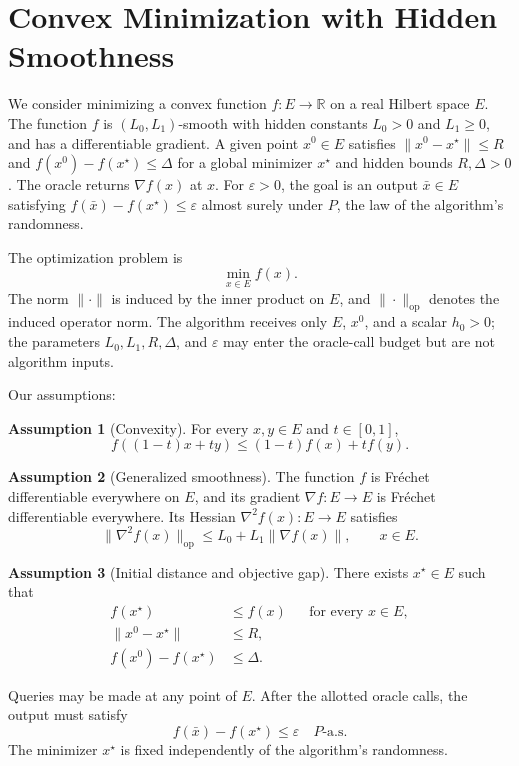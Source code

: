 \documentclass[10pt]{article}
\theoremstyle{definition}
\newtheorem{assumption}{Assumption}
\begin{document}
\section*{Convex Minimization with Hidden Smoothness}
We consider minimizing a convex function $f:E\to\mathbb{R}$ on a real Hilbert space $E$. The function $f$ is $(L_0,L_1)$-smooth with hidden constants $L_0>0$ and $L_1\geq0$, and has a differentiable gradient. A given point $x^0\in E$ satisfies $\|x^0-x^\star\|\leq R$ and $f(x^0)-f(x^\star)\leq\Delta$ for a global minimizer $x^\star$ and hidden bounds $R,\Delta>0$. The oracle returns $\nabla f(x)$ at $x$. For $\varepsilon>0$, the goal is an output $\bar{x}\in E$ satisfying $f(\bar{x})-f(x^\star)\leq\varepsilon$ almost surely under $P$, the law of the algorithm's randomness.

The optimization problem is
\[
\min_{x\in E} f(x).
\]
The norm $\|\cdot\|$ is induced by the inner product on $E$, and $\|\cdot\|_{\mathrm{op}}$ denotes the induced operator norm. The algorithm receives only $E$, $x^0$, and a scalar $h_0>0$; the parameters $L_0,L_1,R,\Delta$, and $\varepsilon$ may enter the oracle-call budget but are not algorithm inputs.

Our assumptions:
\begin{assumption}[Convexity]
For every $x,y\in E$ and $t\in[0,1]$,
\[
f((1-t)x+ty)\leq (1-t)f(x)+t f(y).
\]
\end{assumption}

\begin{assumption}[Generalized smoothness]
The function $f$ is Fr\'echet differentiable everywhere on $E$, and its gradient $\nabla f:E\to E$ is Fr\'echet differentiable everywhere. Its Hessian $\nabla^2 f(x):E\to E$ satisfies
\[
\|\nabla^2 f(x)\|_{\mathrm{op}}
\leq L_0+L_1\|\nabla f(x)\|,
\qquad x\in E.
\]
\end{assumption}

\begin{assumption}[Initial distance and objective gap]
There exists $x^\star\in E$ such that
\[
\begin{aligned}
f(x^\star)&\leq f(x) &&\text{for every }x\in E,\\
\|x^0-x^\star\|&\leq R,\\
f(x^0)-f(x^\star)&\leq\Delta.
\end{aligned}
\]
\end{assumption}

Queries may be made at any point of $E$. After the allotted oracle calls, the output must satisfy
\[
f(\bar{x})-f(x^\star)\leq\varepsilon
\quad P\text{-a.s.}
\]
The minimizer $x^\star$ is fixed independently of the algorithm's randomness.
\end{document}
